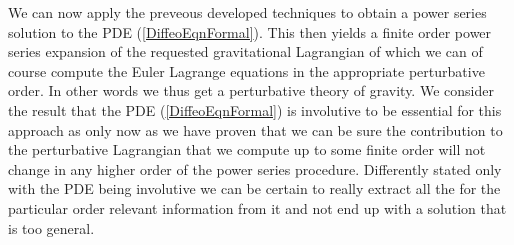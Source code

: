 \documentclass[a4paper,12pt, DIV=14, BCOR=5mm, twoside, headsepline, numbers=noenddot]{scrbook}
\begin{document}
We can now apply the preveous developed techniques to obtain a power series solution to the PDE (\ref{DiffeoEqnFormal}). This then yields a finite order power series expansion of the requested gravitational Lagrangian of which we can of course compute the Euler Lagrange equations in the appropriate perturbative order. In other words we thus get a perturbative theory of gravity. We consider the result that the PDE (\ref{DiffeoEqnFormal}) is involutive to be essential for this approach as only now as we have proven that we can be sure the contribution to the perturbative Lagrangian that we compute up to some finite order will not change in any higher order of the power series procedure. Differently stated only with the PDE being involutive we can be certain to  really extract all the for the particular order relevant information from it and not end up with a solution that is too general. \\
\end{document}

